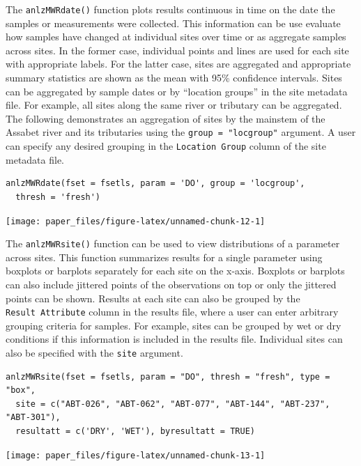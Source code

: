The \texttt{anlzMWRdate()} function plots results continuous in time on the date the samples or measurements were collected. This information can be use evaluate how samples have changed at individual sites over time or as aggregate samples across sites. In the former case, individual points and lines are used for each site with appropriate labels. For the latter case, sites are aggregated and appropriate summary statistics are shown as the mean with 95\% confidence intervals. Sites can be aggregated by sample dates or by ``location groups'' in the site metadata file. For example, all sites along the same river or tributary can be aggregated. The following demonstrates an aggregation of sites by the mainstem of the Assabet river and its tributaries using the \texttt{group\ =\ "locgroup"} argument. A user can specify any desired grouping in the \texttt{Location\ Group} column of the site metadata file.

\begin{verbatim}
anlzMWRdate(fset = fsetls, param = 'DO', group = 'locgroup', 
  thresh = 'fresh')
\end{verbatim}

\begin{center}\texttt{[image: paper\_files/figure-latex/unnamed-chunk-12-1]} \end{center}

The \texttt{anlzMWRsite()} function can be used to view distributions of a parameter across sites. This function summarizes results for a single parameter using boxplots or barplots separately for each site on the x-axis. Boxplots or barplots can also include jittered points of the observations on top or only the jittered points can be shown. Results at each site can also be grouped by the \texttt{Result\ Attribute} column in the results file, where a user can enter arbitrary grouping criteria for samples. For example, sites can be grouped by wet or dry conditions if this information is included in the results file. Individual sites can also be specified with the \texttt{site} argument.

\begin{verbatim}
anlzMWRsite(fset = fsetls, param = "DO", thresh = "fresh", type = "box", 
  site = c("ABT-026", "ABT-062", "ABT-077", "ABT-144", "ABT-237", "ABT-301"),
  resultatt = c('DRY', 'WET'), byresultatt = TRUE)
\end{verbatim}

\begin{center}\texttt{[image: paper\_files/figure-latex/unnamed-chunk-13-1]} \end{center}

